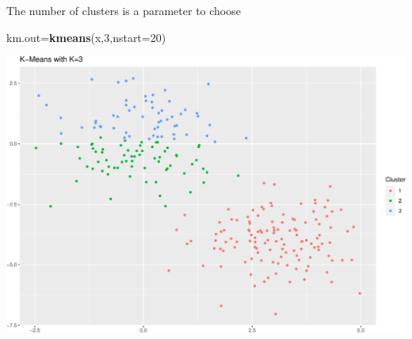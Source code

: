 \documentclass[
  ignorenonframetext,
]{beamer}
\newenvironment{Shaded}{\begin{snugshade}}{\end{snugshade}}
\newcommand{\DataTypeTok}[1]{\textcolor[rgb]{0.13,0.29,0.53}{#1}}
\newcommand{\DecValTok}[1]{\textcolor[rgb]{0.00,0.00,0.81}{#1}}
\newcommand{\KeywordTok}[1]{\textcolor[rgb]{0.13,0.29,0.53}{\textbf{#1}}}
\newcommand{\NormalTok}[1]{#1}
\begin{document}
\begin{frame}[fragile]{The number of clusters is a parameter to choose}
\protect\hypertarget{the-number-of-clusters-is-a-parameter-to-choose}{}

\scriptsize

\begin{Shaded}
\begin{Highlighting}[]
\NormalTok{km.out=}\KeywordTok{kmeans}\NormalTok{(x,}\DecValTok{3}\NormalTok{,}\DataTypeTok{nstart=}\DecValTok{20}\NormalTok{)}
\end{Highlighting}
\end{Shaded}

\includegraphics{unsupervised_learning_files/figure-beamer/unnamed-chunk-6-1.pdf}

\end{frame}
\end{document}
